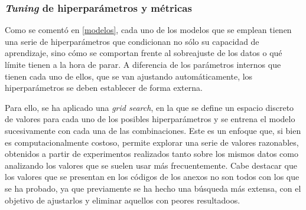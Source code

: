 \documentclass[a4paper,onecolumn]{extarticle}
\begin{document}
\begin{sloppypar}
\subsubsection{\textit{Tuning} de hiperparámetros y métricas} \label{hiperparametros}
Como se comentó en \ref{modelos}, cada uno de los modelos que se emplean tienen una serie de hiperparámetros que condicionan no sólo su capacidad de aprendizaje, sino cómo 
se comportan frente al sobreajuste de los datos o qué límite tienen a la hora de parar. A diferencia de los parámetros internos que tienen cada uno de ellos, que se van 
ajustando automáticamente, los hiperparámetros se deben establecer de forma externa.

Para ello, se ha aplicado una \textit{grid search}, en la que se define un espacio discreto de valores para cada uno de los posibles hiperparámetros y se entrena el modelo 
sucesivamente con cada una de las combinaciones. Este es un enfoque que, si bien es computacionalmente costoso, permite explorar una serie de valores razonables, obtenidos a 
partir de experimentos realizados tanto sobre los mismos datos como analizando los valores que se suelen usar más frecuentemente. Cabe destacar que los valores que se presentan 
en los códigos de los anexos no son todos con los que se ha probado, ya que previamente se ha hecho una búsqueda más extensa, con el objetivo de ajustarlos y eliminar aquellos 
con peores resultadoos.


\end{sloppypar}
\end{document}
